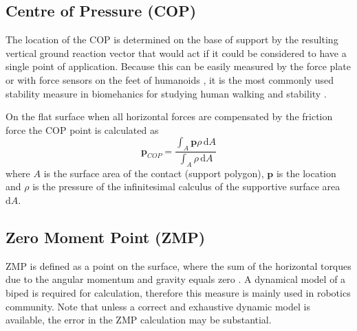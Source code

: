 \documentclass[12pt,a4paper,twoside]{article}
\newcommand{\vvc}[1]{{\bm{#1}}}
\def\d{\,\mathrm{d}}
\newcommand{\p}{\vvc{p}}
\begin{document}
\subsection{{Centre of Pressure (COP)}}

The location of the COP is determined on the base of support by the resulting vertical ground reaction vector that would act if it could be considered to have a single point of application. Because this can be easily measured by the force plate or with force sensors on the feet of humanoids \cite{Winter1995,Goswami1999,Popovic2005}, it is the most commonly used stability measure in biomehanics for studying human walking and stability \cite{Winter1995}. 

On the flat surface when all horizontal forces are compensated by the friction force the COP point is calculated as
\begin{equation}
\p_{COP} = \frac{\int_A \p \rho \d A}{\int_A \rho \d A}
\label{e0}
\end{equation}
where $A$ is the surface area of the contact (support polygon), $\p$ is the location and $\rho$ is the pressure of the infinitesimal calculus of the supportive surface area $\mathrm{d}A$.

\subsection{Zero Moment Point (ZMP)}

ZMP is defined as a point on the surface, where the sum of the horizontal torques due to the angular momentum and gravity equals zero \cite{Vukobratovic2004, Huang2001}. A dynamical model of a biped is required for calculation, therefore this measure is mainly used in robotics community. Note that unless a correct and exhaustive dynamic model is available, the error in the ZMP calculation may be substantial.
\end{document}
